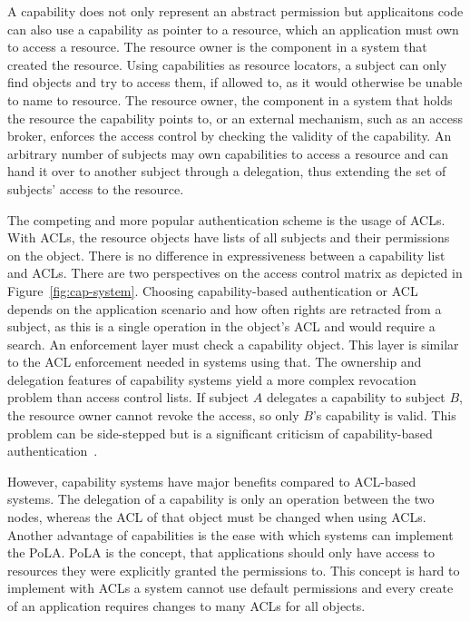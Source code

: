 A capability does not only represent an abstract permission but applicaitons code can also use a capability as pointer to a resource, which an application must own to access a resource.
The resource owner is the component in a system that created the resource. Using capabilities as resource locators, a subject can only find objects and try to access them, if allowed to, as it would otherwise be unable to name to resource. The resource owner, the component in a system that holds the resource the capability points to, or an external mechanism, such as an access broker, enforces the access control by checking the validity of the capability. An arbitrary number of subjects may own capabilities to access a resource and can hand it over to another subject through a delegation, thus extending the set of subjects' access to the resource.

The competing and more popular authentication scheme is the usage of \acp{ACL}. With \acp{ACL}, the resource objects have lists of all subjects and their permissions on the object.
There is no difference in expressiveness between a capability list and \acp{ACL}. There are two perspectives on the access control matrix as depicted in Figure~\ref{fig:cap-system}. Choosing capability-based authentication or \ac{ACL} depends on the application scenario and how often rights are retracted from a subject, as this is a single operation in the object's \ac{ACL} and would require a search. An enforcement layer must check a capability object. This layer is similar to the \ac{ACL} enforcement needed in systems using that.
The ownership and delegation features of capability systems yield a more complex revocation problem than access control lists. If subject $A$ delegates a capability to subject $B$, the resource owner cannot revoke the access, so only $B$'s capability is valid. This problem can be side-stepped but is a significant criticism of capability-based authentication~\cite{millerCapabilityMythsDemolished}.

However, capability systems have major benefits compared to \ac{ACL}-based systems. The delegation of a capability is only an operation between the two nodes, whereas the \ac{ACL} of that object must be changed when using \acp{ACL}. Another advantage of capabilities is the ease with which systems can implement the \ac{PoLA}. \ac{PoLA} is the concept, that applications should only have access to resources they were explicitly granted the permissions to. This concept is hard to implement with \acp{ACL} a system cannot use default permissions and every create of an application requires changes to many \acp{ACL} for all objects.

